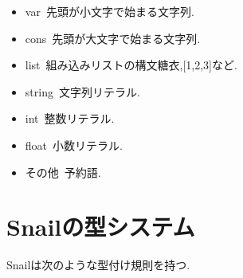 \documentclass{jsarticle}
\begin{document}
\begin{itemize}
  \item var\ 先頭が小文字で始まる文字列.
  \item cons\ 先頭が大文字で始まる文字列.
  \item list\ 組み込みリストの構文糖衣,[1,2,3]など.
  \item string\ 文字列リテラル.
  \item int\ 整数リテラル.
  \item float\ 小数リテラル.
  \item その他\ 予約語.
\end{itemize}

\newpage

\section{Snailの型システム}

Snailは次のような型付け規則を持つ.
\end{document}
